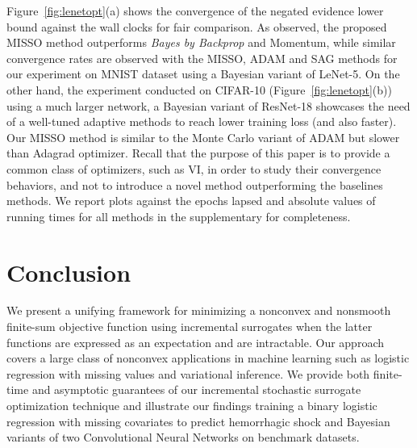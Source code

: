 \documentclass{article}
\begin{document}
Figure~\ref{fig:lenetopt}(a) shows the convergence of the negated evidence lower bound against the wall clocks for fair comparison. 
As observed, the proposed MISSO method outperforms \textit{Bayes by Backprop} and Momentum, while similar convergence rates are observed with the MISSO, ADAM and SAG methods for our experiment on MNIST dataset using a Bayesian variant of LeNet-5. 
On the other hand, the experiment conducted on CIFAR-10 (Figure~\ref{fig:lenetopt}(b)) using a much larger network, \ie a Bayesian variant of ResNet-18 showcases the need of a well-tuned adaptive methods to reach lower training loss (and also faster). Our MISSO method is similar to the Monte Carlo variant of ADAM but slower than Adagrad optimizer. Recall that the purpose of this paper is to provide a common class of optimizers, such as VI, in order to study their convergence behaviors, and not to introduce a novel method outperforming the baselines methods.
We report plots against the epochs lapsed and absolute values of running times for all methods in the supplementary for completeness.

\vspace{-0.1in}
\section{Conclusion}
\vspace{-0.05in}
We present a unifying framework for minimizing a nonconvex and nonsmooth finite-sum objective function using incremental surrogates when the latter functions are expressed as an expectation and are intractable.
Our approach covers a large class of nonconvex applications in machine learning such as logistic regression with missing values and variational inference.
We provide both finite-time and asymptotic guarantees of our incremental stochastic surrogate optimization technique and illustrate our findings training a binary logistic regression with missing covariates to predict hemorrhagic shock and Bayesian variants of two Convolutional Neural Networks on benchmark datasets.



\end{document}
